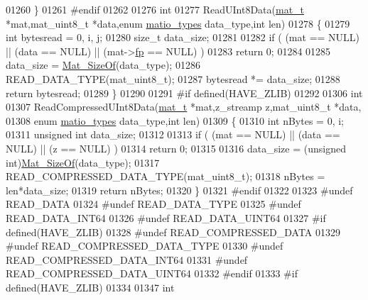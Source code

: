 \begin{DoxyCode}
01260 \}
01261 \textcolor{preprocessor}{#endif}
01262 
01276 \textcolor{keywordtype}{int}
01277 ReadUInt8Data(\hyperlink{struct__mat__t}{mat\_t} *mat,mat\_uint8\_t *data,\textcolor{keyword}{enum} \hyperlink{group___m_a_t_gacf7b3b879282b7ab3a51190e49bf3453}{matio\_types} data\_type,\textcolor{keywordtype}{int} len)
01278 \{
01279     \textcolor{keywordtype}{int} bytesread = 0, i, j;
01280     \textcolor{keywordtype}{size\_t} data\_size;
01281 
01282     \textcolor{keywordflow}{if} ( (mat == NULL) || (data == NULL) || (mat->\hyperlink{struct__mat__t_a85f562e407ca9ad4d2a6e14f839432b7}{fp} == NULL) )
01283         \textcolor{keywordflow}{return} 0;
01284 
01285     data\_size = \hyperlink{group__mat__util_gab6774aabdc124c540c1e7686d0804940}{Mat\_SizeOf}(data\_type);
01286     READ\_DATA\_TYPE(mat\_uint8\_t);
01287     bytesread *= data\_size;
01288     \textcolor{keywordflow}{return} bytesread;
01289 \}
01290 
01291 \textcolor{preprocessor}{#if defined(HAVE\_ZLIB)}
01292 
01306 \textcolor{keywordtype}{int}
01307 ReadCompressedUInt8Data(\hyperlink{struct__mat__t}{mat\_t} *mat,z\_streamp z,mat\_uint8\_t *data,
01308     \textcolor{keyword}{enum} \hyperlink{group___m_a_t_gacf7b3b879282b7ab3a51190e49bf3453}{matio\_types} data\_type,\textcolor{keywordtype}{int} len)
01309 \{
01310     \textcolor{keywordtype}{int} nBytes = 0, i;
01311     \textcolor{keywordtype}{unsigned} \textcolor{keywordtype}{int} data\_size;
01312 
01313     \textcolor{keywordflow}{if} ( (mat == NULL) || (data == NULL) || (z == NULL) )
01314         \textcolor{keywordflow}{return} 0;
01315 
01316     data\_size = (\textcolor{keywordtype}{unsigned} int)\hyperlink{group__mat__util_gab6774aabdc124c540c1e7686d0804940}{Mat\_SizeOf}(data\_type);
01317     READ\_COMPRESSED\_DATA\_TYPE(mat\_uint8\_t);
01318     nBytes = len*data\_size;
01319     \textcolor{keywordflow}{return} nBytes;
01320 \}
01321 \textcolor{preprocessor}{#endif}
01322 
01323 \textcolor{preprocessor}{#undef READ\_DATA}
01324 \textcolor{preprocessor}{#undef READ\_DATA\_TYPE}
01325 \textcolor{preprocessor}{#undef READ\_DATA\_INT64}
01326 \textcolor{preprocessor}{#undef READ\_DATA\_UINT64}
01327 \textcolor{preprocessor}{#if defined(HAVE\_ZLIB)}
01328 \textcolor{preprocessor}{#undef READ\_COMPRESSED\_DATA}
01329 \textcolor{preprocessor}{#undef READ\_COMPRESSED\_DATA\_TYPE}
01330 \textcolor{preprocessor}{#undef READ\_COMPRESSED\_DATA\_INT64}
01331 \textcolor{preprocessor}{#undef READ\_COMPRESSED\_DATA\_UINT64}
01332 \textcolor{preprocessor}{#endif}
01333 \textcolor{preprocessor}{#if defined(HAVE\_ZLIB)}
01334 
01347 \textcolor{keywordtype}{int}

\end{DoxyCode}
